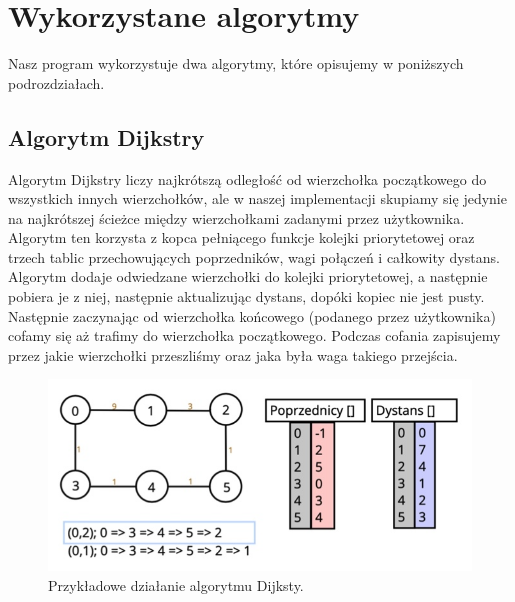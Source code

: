 \documentclass[10pt, a4paper]{report}
\begin{document}
\section{Wykorzystane algorytmy}\label{sec:wykorzystane-algorytmy}
Nasz program wykorzystuje dwa algorytmy, które opisujemy w poniższych
podrozdziałach.

\subsection{Algorytm Dijkstry}\label{subsec:algorytm-dijkstry}
Algorytm Dijkstry liczy najkrótszą odległość od wierzchołka początkowego do
wszystkich innych wierzchołków,
ale w naszej implementacji skupiamy się jedynie na najkrótszej ścieżce między
wierzchołkami zadanymi przez
użytkownika. Algorytm ten korzysta z kopca pełniącego funkcje kolejki
priorytetowej oraz trzech tablic przechowujących
poprzedników, wagi połączeń i całkowity dystans.
Algorytm dodaje odwiedzane wierzchołki do kolejki priorytetowej, a następnie
pobiera je z niej, następnie aktualizując dystans,
dopóki kopiec nie jest pusty. Następnie zaczynając od wierzchołka końcowego
(podanego przez użytkownika) cofamy się aż trafimy do wierzchołka początkowego.
Podczas cofania zapisujemy przez jakie wierzchołki przeszliśmy oraz jaka była
waga takiego przejścia.
\begin{figure}[h]
  \begin{center}
    \includegraphics[scale=0.5]{dijkstra.png}
    \caption{Przykładowe działanie algorytmu Dijksty.}
  \end{center}
\end{figure}
\newpage
\end{document}
